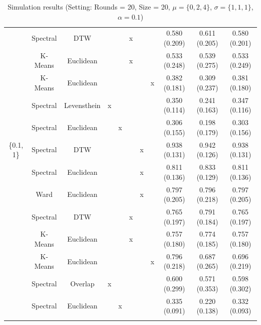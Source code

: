 \documentclass[12pt,a4paper,bibliography=totocnumbered,listof=totocnumbered]{scrartcl}
\begin{document}
{\begin{appendix}
\begin{table}[H]
\begin{tabularx}{\textwidth}{ ccccccccccc}
		& Spectral & DTW &  &  & x &  &  & 0.580 (0.209) & 0.611 (0.205) & 0.580 (0.201) \\ 
		& K-Means & Euclidean &  &  & x &  &  & 0.533 (0.248) & 0.539 (0.275) & 0.533 (0.249) \\ 
		& K-Means & Euclidean &  &  &  &  & x & 0.382 (0.181) & 0.309 (0.237) & 0.381 (0.180) \\ 
		& Spectral & Levensthein & x &  &  &  &  & 0.350 (0.114) & 0.241 (0.163) & 0.347 (0.116) \\ 
		& Spectral & Euclidean &  & x &  &  &  & 0.306 (0.155) & 0.198 (0.179) & 0.303 (0.156) \\ 
		\{0.1, 1\} & Spectral & DTW &  &  &  & x &  & 0.938 (0.131) & 0.942 (0.126) & 0.938 (0.131) \\ 
		& Spectral & Euclidean &  &  &  & x &  & 0.811 (0.136) & 0.833 (0.129) & 0.811 (0.136) \\ 
		& Ward  & Euclidean &  &  &  & x &  & 0.797 (0.205) & 0.796 (0.218) & 0.797 (0.205) \\ 
		& Spectral & DTW &  &  & x &  &  & 0.765 (0.197) & 0.791 (0.184) & 0.765 (0.197) \\ 
		& K-Means & Euclidean &  &  & x &  &  & 0.757 (0.180) & 0.774 (0.185) & 0.757 (0.180) \\ 
		& K-Means & Euclidean &  &  &  &  & x & 0.796 (0.218) & 0.687 (0.265) & 0.696 (0.219) \\ 
		& Spectral & Overlap & x &  &  &  &  & 0.600 (0.299) & 0.571 (0.353) & 0.598 (0.302) \\ 
		& Spectral & Euclidean &  & x &  &  &  & 0.335 (0.091) & 0.220 (0.138) & 0.332 (0.093) \\ 
		\hline \\
	\end{tabularx} 
	\caption{Simulation results (Setting: Rounds = 20, Size = 20, $\mu = \{0,2,4\}$, $\sigma =  \{1,1,1\}$, $\alpha = 0.1$)} 
	\label{tab:apstab1}
\end{table} 


\end{appendix}}
\end{document}

